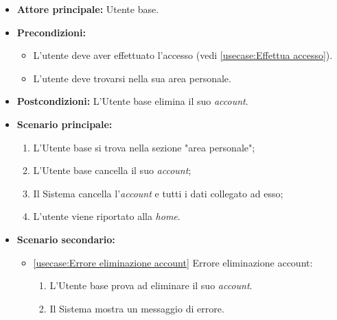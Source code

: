 \label{usecase:Elimina account}
\begin{itemize}
	\item \textbf{Attore principale:} Utente base.

	\item \textbf{Precondizioni:}
	\begin{itemize}
        \item L'utente deve aver effettuato l'accesso (vedi \autoref{usecase:Effettua accesso}).
        \item L'utente deve trovarsi nella sua area personale.
    \end{itemize}

	\item \textbf{Postcondizioni:} L'Utente base elimina il suo \textit{account}.

	\item \textbf{Scenario principale:}
	      \begin{enumerate}
		      \item L'Utente base si trova nella sezione "area personale";
		      \item L'Utente base cancella il suo \textit{account};
              \item Il Sistema cancella l'\textit{account} e tutti i dati collegato ad esso;
              \item L'utente viene riportato alla \textit{home}.
	      \end{enumerate}
	\item \textbf{Scenario secondario:}
		  \begin{itemize}
			  \item \autoref{usecase:Errore eliminazione account} Errore eliminazione account:
				\begin{enumerate}
					\item L'Utente base prova ad eliminare il suo \textit{account}.
					\item Il Sistema mostra un messaggio di errore.
				\end{enumerate}
		  \end{itemize}
\end{itemize}
